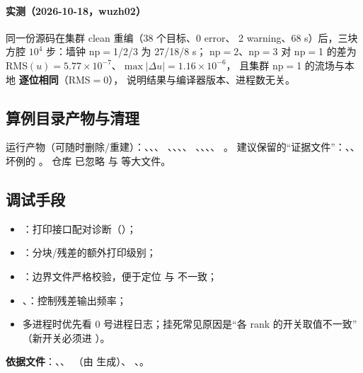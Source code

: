 \paragraph{实测（2026-10-18，wuzh02）}同一份源码在集群 clean 重编（38 个目标、0 error、
2 warning、68 s）后，三块方腔 $10^{4}$ 步：墙钟 np$=$1/2/3 为 27/18/8 s；
np$=$2、np$=$3 对 np$=$1 的差为 RMS$(u)=5.77\times10^{-7}$、$\max|\Delta u|=1.16\times10^{-6}$，
且集群 np$=$1 的流场与本地  \textbf{逐位相同}（RMS$=0$），
说明结果与编译器版本、进程数无关。

\subsection{算例目录产物与清理}
运行产物（可随时删除/重建）：、、、
、、、、
、、、、
。
建议保留的“证据文件”：、、坏例的 。
仓库  已忽略  与  等大文件。

\subsection{调试手段}
\begin{itemize}
  \item {}：打印接口配对诊断（）；
  \item {}：分块/残差的额外打印级别；
  \item {}：边界文件严格校验，便于定位  与
         不一致；
  \item {}、：控制残差输出频率；
  \item 多进程时优先看 0 号进程日志；挂死常见原因是“各 rank 的开关取值不一致”
        （新开关必须进 ）。
\end{itemize}

\noindent\textbf{依据文件}：、、
（由  生成）、
、。
